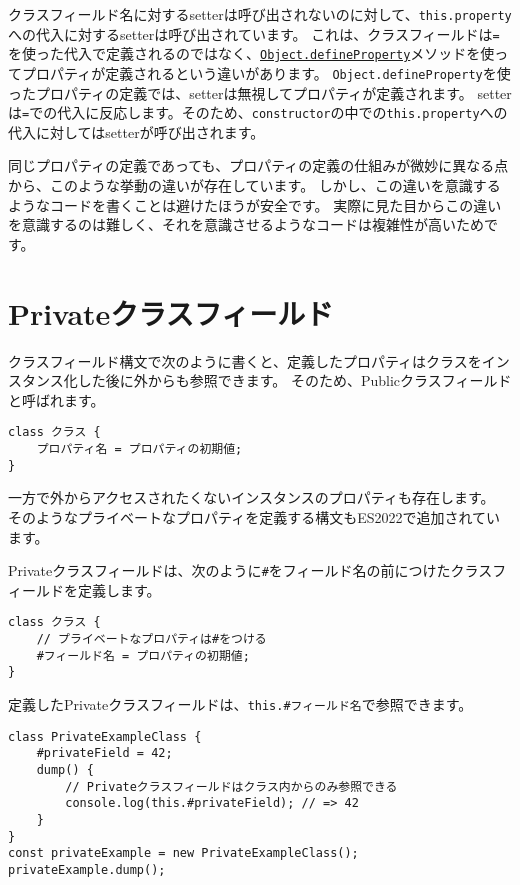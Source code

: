 \begin{tcolorbox}[enhanced jigsaw,breakable,title=クラスフィールドとインスタンスのプロパティの違い]
クラスフィールド名に対するsetterは呼び出されないのに対して、\texttt{this.property}への代入に対するsetterは呼び出されています。
これは、クラスフィールドは\texttt{=}を使った代入で定義されるのではなく、\href{https://developer.mozilla.org/ja/docs/Web/JavaScript/Reference/Global_Objects/Object/defineProperty}{\texttt{Object.defineProperty}}メソッドを使ってプロパティが定義されるという違いがあります。
\texttt{Object.defineProperty}を使ったプロパティの定義では、setterは無視してプロパティが定義されます。
setterは\texttt{=}での代入に反応します。そのため、\texttt{constructor}の中での\texttt{this.property}への代入に対してはsetterが呼び出されます。

同じプロパティの定義であっても、プロパティの定義の仕組みが微妙に異なる点から、このような挙動の違いが存在しています。
しかし、この違いを意識するようなコードを書くことは避けたほうが安全です。
実際に見た目からこの違いを意識するのは難しく、それを意識させるようなコードは複雑性が高いためです。
\end{tcolorbox}

\hypertarget{private-class-fields}{%
\section{Privateクラスフィールド\,\protect{}}\label{private-class-fields}}

クラスフィールド構文で次のように書くと、定義したプロパティはクラスをインスタンス化した後に外からも参照できます。
そのため、Publicクラスフィールドと呼ばれます。

\begin{lstlisting}
class クラス {
    プロパティ名 = プロパティの初期値;
}
\end{lstlisting}

一方で外からアクセスされたくないインスタンスのプロパティも存在します。
そのようなプライベートなプロパティを定義する構文もES2022で追加されています。

Privateクラスフィールドは、次のように\texttt{\#}をフィールド名の前につけたクラスフィールドを定義します。

\begin{lstlisting}
class クラス {
    // プライベートなプロパティは#をつける
    #フィールド名 = プロパティの初期値;
}
\end{lstlisting}

定義したPrivateクラスフィールドは、\texttt{this.\#フィールド名}で参照できます。

\begin{lstlisting}
class PrivateExampleClass {
    #privateField = 42;
    dump() {
        // Privateクラスフィールドはクラス内からのみ参照できる
        console.log(this.#privateField); // => 42
    }
}
const privateExample = new PrivateExampleClass();
privateExample.dump();
\end{lstlisting}

